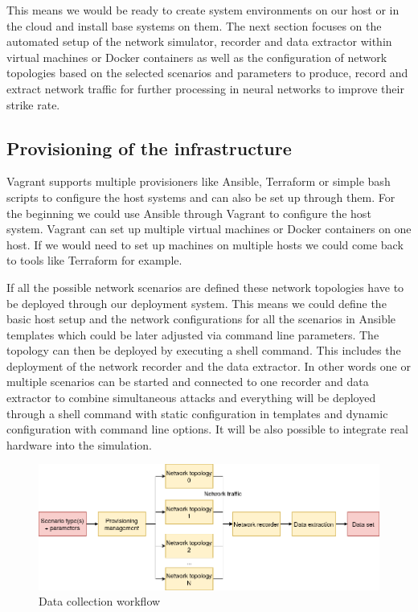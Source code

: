 \documentclass[conference]{IEEEtran}
\begin{document}
This means we would be ready to create system environments on our host or in the cloud and install base systems on them. The next section focuses on the automated setup of the network simulator, recorder and data extractor within virtual machines or Docker containers as well as the configuration of network topologies based on the selected scenarios and parameters to produce, record and extract network traffic for further processing in neural networks to improve their strike rate.

\subsection{Provisioning of the infrastructure}

Vagrant supports multiple provisioners like Ansible, Terraform or simple bash scripts to configure the host systems and can also be set up through them. For the beginning we could use Ansible through Vagrant to configure the host system. Vagrant can set up multiple virtual machines or Docker containers on one host. If we would need to set up machines on multiple hosts we could come back to tools like Terraform for example. \cite{b9} \cite{b10} \cite{b11}

If all the possible network scenarios are defined these network topologies have to be deployed through our deployment system. This means we could define the basic host setup and the network configurations for all the scenarios in Ansible templates which could be later adjusted via command line parameters. The topology can then be deployed by executing a shell command. This includes the deployment of the network recorder and the data extractor. In other words one or multiple scenarios can be started and connected to one recorder and data extractor to combine simultaneous attacks and everything will be deployed through a shell command with static configuration in templates and dynamic configuration with command line options. It will be also possible to integrate real hardware into the simulation. \cite{b9}

\begin{figure}[htbp]
\centerline{\includegraphics[scale=0.28]{design_flow.png}}
\caption{Data collection workflow}
\label{design-flow}
\end{figure}
\end{document}
